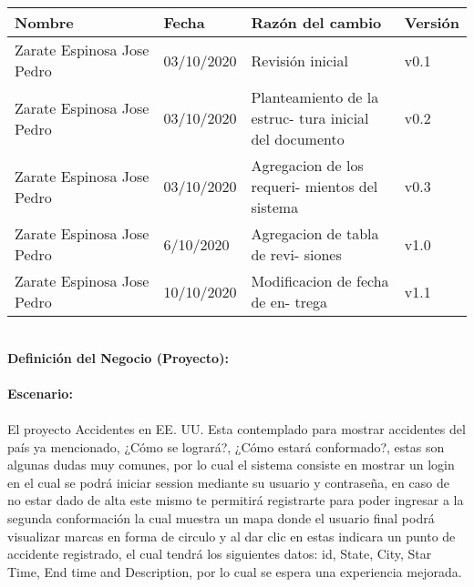 \documentclass[40pt]{article}
\begin{document}
\vspace{0.5 cm}
\begin{table}[h!]
\centering
\begin{tabular}{|p{0.35\linewidth}|p{0.15\linewidth}|p{0.35\linewidth}|p{0.15\linewidth}|}
\hline
\textbf{Nombre}&\textbf{Fecha}&\textbf{Razón del cambio}&\textbf{Versión}
\\\hline
Zarate Espinosa Jose Pedro & 03/10/2020 & Revisión inicial & v0.1 \\\hline
Zarate Espinosa Jose Pedro & 03/10/2020 & Planteamiento de la estruc- tura inicial del documento & v0.2 \\\hline
Zarate Espinosa Jose Pedro & 03/10/2020 & Agregacion de los requeri- mientos del sistema & v0.3 \\\hline
Zarate Espinosa Jose Pedro & 6/10/2020 & Agregacion de tabla de revi- siones & v1.0 \\\hline
Zarate Espinosa Jose Pedro & 10/10/2020 & Modificacion de fecha de en- trega & v1.1 \\\hline
\end{tabular}
\end{table}

\newpage

\maketitle
\textsf{\ \\
\textbf{Definición del Negocio (Proyecto):} \\
\\
\textbf{Escenario:}\\
\\
El proyecto Accidentes en EE. UU. Esta contemplado para mostrar accidentes del país ya mencionado, ¿Cómo se logrará?, ¿Cómo estará conformado?, estas son algunas dudas muy comunes, por lo cual el sistema consiste en mostrar un login en el cual se podrá iniciar session mediante su usuario y contraseña,  en caso de no estar dado de alta este mismo te permitirá registrarte para poder ingresar a la segunda conformación la cual muestra un mapa donde el usuario final podrá visualizar marcas en forma de circulo y al dar clic en estas indicara un punto de accidente registrado, el cual tendrá los siguientes datos: id, State, City, Star Time, End time and Description, por lo cual se espera una experiencia mejorada. \\}
\end{document}
